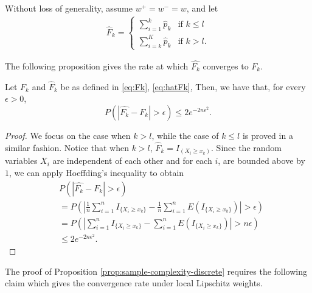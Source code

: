 
Without loss of generality, assume $w^+=w^-=w$, and let
\begin{align}
\label{eq:hatFk}
\hat F_k = 
\begin{cases}
   \sum_{i=1}^k \hat p_k & \text{if   } k \leq l \\
   \sum_{i=k}^K \hat p_k & \text{if  }  k > l.
\end{cases}  
\end{align}

The following proposition gives the rate at which $\hat{F_k}$ converges to $F_k$.
\begin{proposition}
\label{prop:hoeffding-discrete}
Let $F_k$ and $\hat F_k$ be as defined in \eqref{eq:Fk}, \eqref{eq:hatFk}, Then, we have that, for every $\epsilon >0$, 
$$P(|\hat{F_k}-F_k| > \epsilon) \leq 2 e^{-2n \epsilon^2}.$$
\end{proposition}
\begin{proof}
We focus on the case when $k > l$, while the case of $k \leq l$ is proved in a similar fashion.
Notice that when $k>l$,  $\hat F_k =I_{(X_i \geq  x_k) }$. Since the random variables $X_i$ are independent of each other and  for each $i$, are bounded above by $1$, we can apply Hoeffding's inequality to obtain 
\begin{align*}
&P(\left|\hat{F_k}- F_k \right| > \epsilon)  \\
&= P(\left| \frac{1}{n} \sum_{i=1}^n I_{\{X_i \geq
x_k\}} - \frac{1}{n} \sum_{i=1}^n E(I_{\{X_i \geq x_k\}}) \right| > \epsilon) \\ & = P(\left|
\sum_{i=1}^n I_{\{X_i \geq x_k\}} - \sum_{i=1}^n E(I_{\{X_i \geq x_k\}}) \right| > n\epsilon) \\ &
    \leq 2e^{-2n \epsilon^2}.
\end{align*}
\end{proof}
The proof of Proposition \ref{prop:sample-complexity-discrete} requires the following claim which gives the convergence rate under local Lipschitz weights. 

